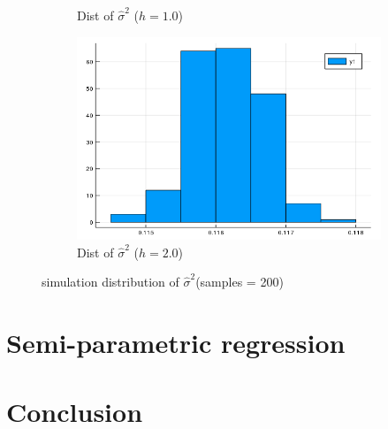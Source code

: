 \documentclass{article}
\begin{document}
\begin{figure}[htb]
\begin{subfigure}[b]{0.24\linewidth}
    \caption{Dist of $\hat{\sigma}^2$ ($h=1.0$)}
  \end{subfigure}
  \begin{subfigure}[b]{0.24\linewidth}
    \includegraphics[width=\linewidth]{images/std_est_4.png}
    \caption{Dist of $\hat{\sigma}^2$ ($h=2.0$)}
  \end{subfigure}
  \caption{simulation distribution of $\hat{\sigma}^2$(samples = 200)}
  \label{fig:std_est}
\end{figure}


\section{Semi-parametric regression}

\section{Conclusion}




  
\end{document}
